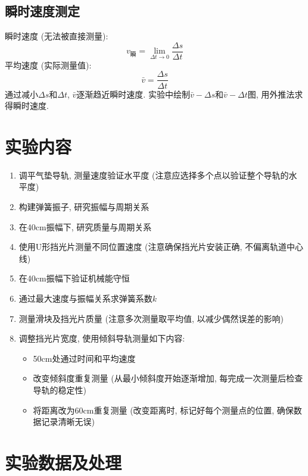 \documentclass[zihao=5, UTF8]{article}
\theoremstyle{MyLineTheoremStyle} %
\theoremstyle{MyBlockTheoremStyle} %
\theoremstyle{MySubsubsectionStyle} %
\begin{document}
\subsection{瞬时速度测定}
瞬时速度 (无法被直接测量): 
\begin{equation}
v_{瞬} = \lim_{\Delta t \to 0}\frac{\Delta s}{\Delta t}
\end{equation}
平均速度 (实际测量值): 
\begin{equation}
\bar{v} = \frac{\Delta s}{\Delta t}
\end{equation}
通过减小$\Delta s$和$\Delta t$, $\bar{v}$逐渐趋近瞬时速度. 实验中绘制$\bar{v}-\Delta s$和$\bar{v}-\Delta t$图, 用外推法求得瞬时速度. 

\section{实验内容}
\begin{enumerate}
    \item 调平气垫导轨, 测量速度验证水平度 (注意应选择多个点以验证整个导轨的水平度)
    \item 构建弹簧振子, 研究振幅与周期关系 
    \item 在40cm振幅下, 研究质量与周期关系
    \item 使用U形挡光片测量不同位置速度 (注意确保挡光片安装正确, 不偏离轨道中心线)
    \item 在40cm振幅下验证机械能守恒
    \item 通过最大速度与振幅关系求弹簧系数$k$
    \item 测量滑块及挡光片质量 (注意多次测量取平均值, 以减少偶然误差的影响)
    \item 调整挡光片宽度, 使用倾斜导轨测量如下内容: 
        \begin{itemize}
            \item 50cm处通过时间和平均速度
            \item 改变倾斜度重复测量 (从最小倾斜度开始逐渐增加, 每完成一次测量后检查导轨的稳定性)
            \item 将距离改为60cm重复测量 (改变距离时, 标记好每个测量点的位置, 确保数据记录清晰无误)
        \end{itemize}
\end{enumerate}

\section{实验数据及处理}
\end{document}
